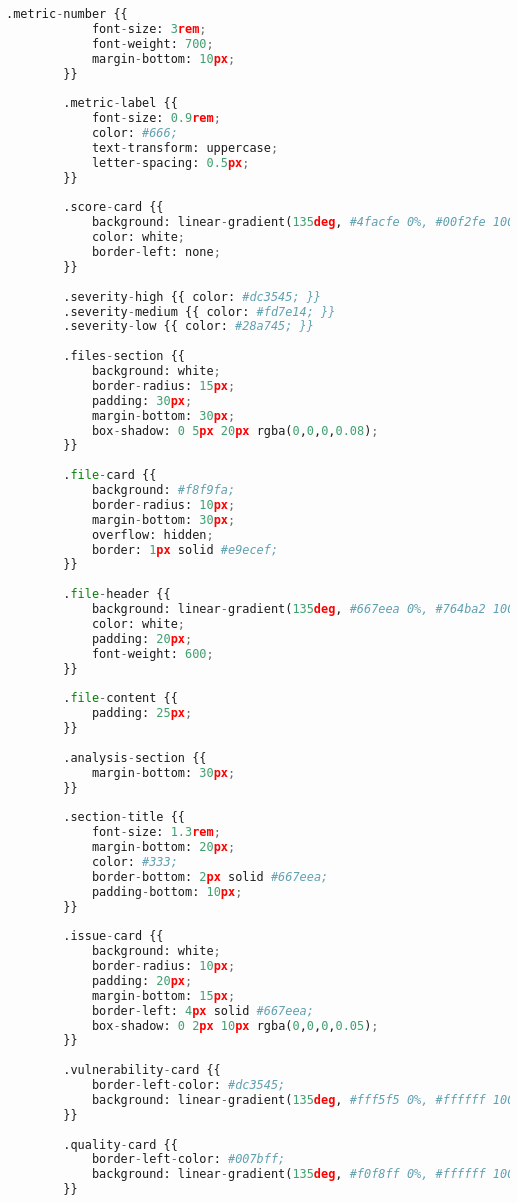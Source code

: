 \begin{lstlisting}[language=python, caption={Contenido completo del script ai\_analyzer.py.}, label={lst:python_script}]
        .metric-number {{
            font-size: 3rem;
            font-weight: 700;
            margin-bottom: 10px;
        }}
        
        .metric-label {{
            font-size: 0.9rem;
            color: #666;
            text-transform: uppercase;
            letter-spacing: 0.5px;
        }}
        
        .score-card {{
            background: linear-gradient(135deg, #4facfe 0%, #00f2fe 100%);
            color: white;
            border-left: none;
        }}
        
        .severity-high {{ color: #dc3545; }}
        .severity-medium {{ color: #fd7e14; }}
        .severity-low {{ color: #28a745; }}
        
        .files-section {{
            background: white;
            border-radius: 15px;
            padding: 30px;
            margin-bottom: 30px;
            box-shadow: 0 5px 20px rgba(0,0,0,0.08);
        }}
        
        .file-card {{
            background: #f8f9fa;
            border-radius: 10px;
            margin-bottom: 30px;
            overflow: hidden;
            border: 1px solid #e9ecef;
        }}
        
        .file-header {{
            background: linear-gradient(135deg, #667eea 0%, #764ba2 100%);
            color: white;
            padding: 20px;
            font-weight: 600;
        }}
        
        .file-content {{
            padding: 25px;
        }}
        
        .analysis-section {{
            margin-bottom: 30px;
        }}
        
        .section-title {{
            font-size: 1.3rem;
            margin-bottom: 20px;
            color: #333;
            border-bottom: 2px solid #667eea;
            padding-bottom: 10px;
        }}
        
        .issue-card {{
            background: white;
            border-radius: 10px;
            padding: 20px;
            margin-bottom: 15px;
            border-left: 4px solid #667eea;
            box-shadow: 0 2px 10px rgba(0,0,0,0.05);
        }}
        
        .vulnerability-card {{
            border-left-color: #dc3545;
            background: linear-gradient(135deg, #fff5f5 0%, #ffffff 100%);
        }}
        
        .quality-card {{
            border-left-color: #007bff;
            background: linear-gradient(135deg, #f0f8ff 0%, #ffffff 100%);
        }}
        

\end{lstlisting}
